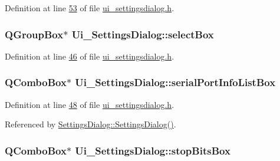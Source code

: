 Definition at line \hyperlink{a00054_source_l00053}{53} of file \hyperlink{a00054_source}{ui\+\_\+settingsdialog.\+h}.

\hypertarget{a00029_aea3871481f7ecb94f1835e519631f9a2}{
\subsubsection[{select\+Box}]{\setlength{\rightskip}{0pt plus 5cm}Q\+Group\+Box$\ast$ Ui\+\_\+\+Settings\+Dialog\+::select\+Box}}\label{a00029_aea3871481f7ecb94f1835e519631f9a2}


Definition at line \hyperlink{a00054_source_l00046}{46} of file \hyperlink{a00054_source}{ui\+\_\+settingsdialog.\+h}.

\hypertarget{a00029_a323eca0d6d4b94d2d41c7737fe8b2282}{
\subsubsection[{serial\+Port\+Info\+List\+Box}]{\setlength{\rightskip}{0pt plus 5cm}Q\+Combo\+Box$\ast$ Ui\+\_\+\+Settings\+Dialog\+::serial\+Port\+Info\+List\+Box}}\label{a00029_a323eca0d6d4b94d2d41c7737fe8b2282}


Definition at line \hyperlink{a00054_source_l00048}{48} of file \hyperlink{a00054_source}{ui\+\_\+settingsdialog.\+h}.



Referenced by \hyperlink{a00044_source_l00052}{Settings\+Dialog\+::\+Settings\+Dialog()}.

\hypertarget{a00029_ad61890c5fd0acc9e72385efd02df90c0}{
\subsubsection[{stop\+Bits\+Box}]{\setlength{\rightskip}{0pt plus 5cm}Q\+Combo\+Box$\ast$ Ui\+\_\+\+Settings\+Dialog\+::stop\+Bits\+Box}}\label{a00029_ad61890c5fd0acc9e72385efd02df90c0}


